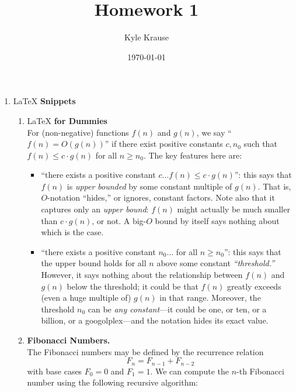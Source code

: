 \documentclass{article}
\title{Homework 1}
\author{Kyle Krause}
\date{\today}
\begin{document}
\maketitle

\begin{enumerate}



    \item \LaTeX \textbf{ Snippets}
    \begin{enumerate}
        \item \LaTeX \textbf{ for Dummies} \\
        For (non-negative) functions $f(n)$ and $g(n)$, we say ``$f(n) = O(g(n))$'' if there exist positive constants $c, n_0$ such that $f(n) \leq c \cdot g(n)$ for all $n \geq n_0$. The key features here are:

        \begin{itemize}
            \item ``there exists a positive constant $c \dots f(n) \leq c \cdot g(n)$'': this says that $f(n)$ is \textit{upper bounded} by some constant multiple of $g(n)$. That is, $O$-notation ``hides,'' or ignores, constant factors. Note also that it captures only an \textit{upper bound}: $f(n)$ might actually be much smaller than $c \cdot g(n)$, or not. A big-$O$ bound by itself says nothing about which is the case.
            \item ``there exists a positive constant $n_0 \dots$ for all $n \geq n_0$'': this says that the upper bound holds for all $n$ above some constant \textit{``threshold.''} However, it says nothing about the relationship between $f(n)$ and $g(n)$ below the threshold; it could be that $f(n)$ greatly exceeds (even a huge multiple of) $g(n)$ in that range. Moreover, the threshold $n_0$ can be \textit{any constant}---it could be one, or ten, or a billion, or a googolplex---and the notation hides its exact value.
        \end{itemize}



        \item \textbf{Fibonacci Numbers.} \\
        The Fibonacci numbers may be defined by the recurrence relation
        \[
        F_n = F_{n-1} + F_{n-2}
        \]
        with base cases $F_0 = 0$ and $F_1 = 1$. We can compute the $n$-th Fibonacci number using the following recursive algorithm:


\end{enumerate}
\end{enumerate}
\end{document}
